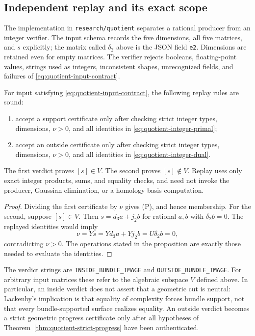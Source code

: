\subsection{Independent replay and its exact scope}

The implementation in \texttt{research/quotient} separates a rational
producer from an integer verifier. The input schema records the five
dimensions, all five matrices, and $s$ explicitly; the matrix called
$\delta_2$ above is the JSON field \texttt{e2}. Dimensions are retained
even for empty matrices. The verifier rejects booleans, floating-point
values, strings used as integers, inconsistent shapes, unrecognized
fields, and failures of \eqref{eq:quotient-input-contract}.

\begin{proposition}
\label{prop:quotient-replay}
For input satisfying \eqref{eq:quotient-input-contract}, the following
replay rules are sound:
\begin{enumerate}
 \item accept a support certificate only after checking strict
 integer types, dimensions, $\nu>0$, and all identities in
 \eqref{eq:quotient-integer-primal};
 \item accept an outside certificate only after checking strict
 integer types, dimensions, $\nu>0$, and all identities in
 \eqref{eq:quotient-integer-dual}.
\end{enumerate}
The first verdict proves $[s]\in V$. The second proves $[s]\notin V$.
Replay uses only exact integer products, sums, and equality checks,
and need not invoke the producer, Gaussian elimination, or a homology
basis computation.
\end{proposition}

\begin{proof}
Dividing the first certificate by $\nu$ gives (P), and hence
membership. For the second, suppose $[s]\in V$. Then
$s=d_3a+j_2b$ for rational $a,b$ with $\delta_2b=0$.
The replayed identities would imply
\[
 \nu=Ys=Yd_3a+Yj_2b=U\delta_2b=0,
\]
contradicting $\nu>0$. The operations stated in the proposition
are exactly those needed to evaluate the identities.
\end{proof}

The verdict strings are \texttt{INSIDE\_BUNDLE\_IMAGE} and
\texttt{OUTSIDE\_BUNDLE\_IMAGE}. For arbitrary input matrices these
refer to the algebraic subspace $V$ defined above. In particular,
an inside verdict does not assert that a geometric cut is neutral:
Lackenby's implication is that equality of complexity forces bundle
support, not that every bundle-supported surface realizes equality.
An outside verdict becomes a strict geometric progress certificate
only after all hypotheses of
Theorem~\ref{thm:quotient-strict-progress} have been authenticated.

